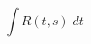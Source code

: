\documentclass[12pt]{article}
\begin{document}
\begin{displaymath}
\int R(t,s) \; dt
\end{displaymath}
\end{document}
